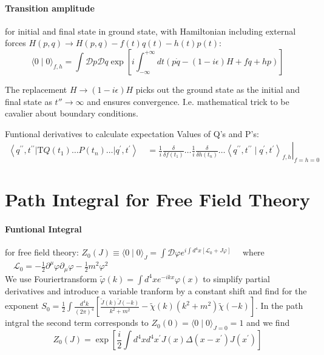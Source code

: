 \paragraph{Transition amplitude} for initial and final state in ground state, with Hamiltonian
including external forces $H(p, q) \rightarrow H(p, q)-f(t) q(t)-h(t) p(t)$:
$$\langle 0 \mid 0\rangle_{f, h}=\int \mathcal{D} p \mathcal{D} q \exp \left[i \int_{-\infty}^{+\infty} d t(p \dot{q}-(1-i \epsilon) H+f q+h p)\right]$$
\begin{remark}
The replacement $H \rightarrow(1-i \epsilon) H$ picks out the ground state as the initial and final state as $t'' \rightarrow \infty$ and ensures convergence. I.e. mathematical trick to be cavalier
about boundary conditions. 
\end{remark}

Funtional derivatives to calculate expectation Values of Q's and P's:
$\begin{array}{l}
  \left\langle q^{\prime \prime}, t^{\prime \prime}\left|\mathrm{T} Q\left(t_1\right) \ldots P\left(t_n\right) \ldots\right| q^{\prime}, t^{\prime}\right\rangle 
  \quad=\left.\frac{1}{i} \frac{\delta}{\delta f\left(t_1\right)} \ldots \frac{1}{i} \frac{\delta}{\delta h\left(t_n\right)} \ldots\left\langle q^{\prime \prime}, t^{\prime \prime} \mid q^{\prime}, t^{\prime}\right\rangle_{f, h}\right|_{f=h=0}
  \end{array}$


\section{Path Integral for Free Field Theory}
\paragraph{Funtional Integral} for free field theory: $Z_0(J) \equiv\langle 0 \mid 0\rangle_J=\int \mathcal{D} \varphi e^{i \int d^4 x\left[\mathcal{L}_0+J \varphi\right]} \quad $
where $\quad \mathcal{L}_0=-\frac{1}{2} \partial^\mu \varphi \partial_\mu \varphi-\frac{1}{2} m^2 \varphi^2$ \\

We use Fouriertransform $\widetilde{\varphi}(k)=\int d^4 x e^{-i k x} \varphi(x)$ to simplify partial derivatives and 
introduce a variable tranform by a constant shift and find for the exponent $S_0=\frac{1}{2} \int \frac{d^4 k}{(2 \pi)^4}\left[\frac{\widetilde{J}(k) \widetilde{J}(-k)}{k^2+m^2}-\widetilde{\chi}(k)\left(k^2+m^2\right) \widetilde{\chi}(-k)\right]$.
In the path intgral the second term corresponds to $Z_0(0)=\langle 0 \mid 0\rangle_{J=0}=1$ and we find 
$$Z_0(J) = \exp \left[\frac{i}{2} \int d^4 x d^4 x^{\prime} J(x) \Delta\left(x-x^{\prime}\right) J\left(x^{\prime}\right)\right]$$\\

